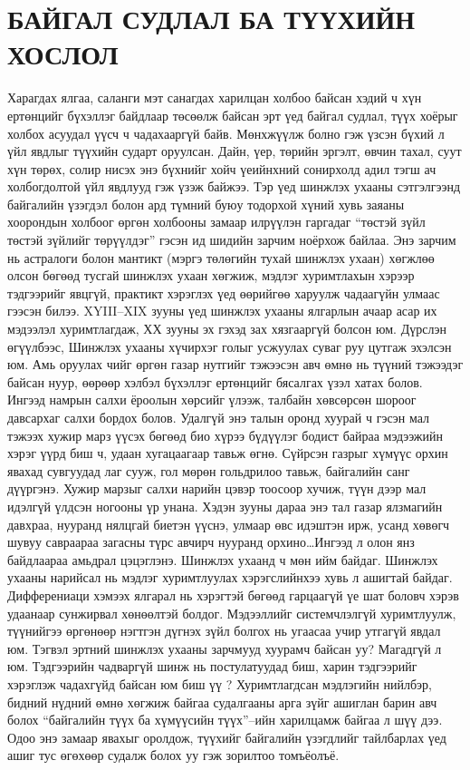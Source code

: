 \section{БАЙГАЛ СУДЛАЛ БА ТҮҮХИЙН ХОСЛОЛ}
Харагдах ялгаа, саланги мэт санагдах харилцан холбоо байсан хэдий ч хүн ертөнцийг бүхэллэг байдлаар төсөөлж байсан эрт үед байгал судлал, түүх хоёрыг холбох асуудал үүсч ч чадахааргүй байв. Мөнхжүүлж болно гэж үзсэн бүхий л үйл явдлыг түүхийн сударт оруулсан. Дайн, үер, төрийн эргэлт, өвчин тахал, суут хүн төрөх, солир нисэх энэ бүхнийг хойч үеийнхний сонирхолд адил тэгш ач холбогдолтой үйл явдлууд гэж үзэж байжээ. Тэр үед шинжлэх ухааны сэтгэлгээнд байгалийн үзэгдэл болон ард түмний буюу тодорхой хүний хувь заяаны хоорондын холбоог өргөн холбооны замаар илрүүлэн гаргадаг “төстэй зүйл төстэй зүйлийг төрүүлдэг” гэсэн ид шидийн зарчим ноёрхож байлаа. Энэ зарчим нь астралоги болон мантикт (мэргэ төлөгийн тухай шинжлэх ухаан) хөгжлөө олсон бөгөөд тусгай шинжлэх ухаан хөгжиж, мэдлэг хуримтлахын хэрээр тэдгээрийг явцгүй, практикт хэрэглэх үед өөрийгөө харуулж чадаагүйн улмаас гээсэн билээ.
XYIII–XIX зууны үед шинжлэх ухааны ялгарлын ачаар асар их мэдээлэл хуримтлагдаж, ХХ зууны эх гэхэд зах хязгааргүй болсон юм. Дүрслэн өгүүлбээс, Шинжлэх ухааны хүчирхэг голыг усжуулах суваг руу цутгаж эхэлсэн юм. Амь оруулах чийг өргөн газар нутгийг тэжээсэн авч өмнө нь түүний тэжээдэг байсан нуур, өөрөөр хэлбэл бүхэллэг ертөнцийг бясалгах үзэл хатах болов. Ингээд намрын салхи ёроолын хөрсийг үлээж, талбайн хөвсөрсөн шороог давсархаг салхи бордох болов. Удалгүй энэ талын оронд хуурай ч гэсэн мал тэжээх хужир марз үүсэх бөгөөд био хүрээ бүдүүлэг бодист байраа мэдээжийн хэрэг үүрд биш ч, удаан хугацаагаар тавьж өгнө. Сүйрсэн газрыг хүмүүс орхин явахад сувгуудад лаг сууж, гол мөрөн гольдрилоо тавьж, байгалийн санг дүүргэнэ. Хужир марзыг салхи нарийн цэвэр тоосоор хучиж, түүн дээр мал идэлгүй үлдсэн ногооны үр унана. Хэдэн зууны дараа энэ тал газар ялзмагийн давхраа, нууранд нялцгай биетэн үүснэ, улмаар өвс идэштэн ирж, усанд хөвөгч шувуу савраараа загасны түрс авчирч нууранд орхино…Ингээд л олон янз байдлаараа амьдрал цэцэглэнэ.
Шинжлэх ухаанд ч мөн ийм байдаг. Шинжлэх ухааны нарийсал нь мэдлэг хуримтлуулах хэрэгслийнхээ хувь л ашигтай байдаг. Дифферениаци хэмээх ялгарал нь хэрэгтэй бөгөөд гарцаагүй үе шат боловч хэрэв удаанаар сунжирвал хөнөөлтэй болдог. Мэдээллийг системчлэлгүй хуримтлуулж, түүнийгээ өргөнөөр нэгтгэн дүгнэх зүйл болгох нь угаасаа учир утгагүй явдал юм. Тэгвэл эртний шинжлэх ухааны зарчмууд хуурамч байсан уу? Магадгүй л юм. Тэдгээрийн чадваргүй шинж нь постулатуудад биш, харин тэдгээрийг хэрэглэж чадахгүйд байсан юм биш үү ? Хуримтлагдсан мэдлэгийн нийлбэр, бидний нүдний өмнө хөгжиж байгаа судалгааны арга зүйг ашиглан барин авч болох “байгалийн түүх ба хүмүүсийн түүх”–ийн харилцамж байгаа л шүү дээ. Одоо энэ замаар явахыг оролдож, түүхийг байгалийн үзэгдлийг тайлбарлах үед ашиг тус өгөхөөр судалж болох уу гэж зорилтоо томъёолъё.
